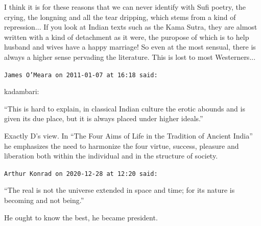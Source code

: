 \begin{footnotesize}
\begin{sffamily}
I think it is for these reasons that we can never identify with Sufi poetry, the crying, the longning and all the tear dripping, which stems from a kind of repression... If you look at Indian texts such as the Kama Sutra, they are almost written with a kind of detachment as it were, the puropose of which is to help husband and wives have a happy marriage! So even at the most sensual, there is always a higher sense pervading the literature. This is lost to most Westerners... \hfill

\texttt{James O'Meara on 2011-01-07 at 16:18 said:}

kadambari:

``This is hard to explain, in classical Indian culture the erotic abounds and is given its due place, but it is always placed under higher ideals.''

Exactly D's view. In ``The Four Aims of Life in the Tradition of Ancient India'' he emphasizes the need to harmonize the four virtue, success, pleasure and liberation both within the individual and in the structure of society.

\hfill

\texttt{Arthur Konrad on 2020-12-28 at 12:20 said:}

``The real is not the universe extended in space and time; for its nature is becoming and not being.''

He ought to know the best, he became president.


\hfill

\end{sffamily}
\end{footnotesize}

